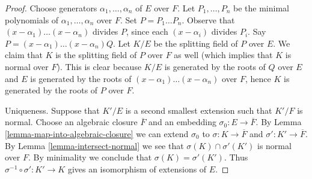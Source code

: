 \documentclass[10pt,a4paper]{amsart}
\theoremstyle{plain}
\theoremstyle{definition}
\theoremstyle{remark}
\numberwithin{equation}{subsection}
\begin{document}
\begin{proof}
Choose generators $\alpha_1, \ldots, \alpha_n$ of $E$ over $F$.
Let $P_1, \ldots, P_n$ be the minimal polynomials of
$\alpha_1, \ldots, \alpha_n$ over $F$. Set $P = P_1 \ldots P_n$.
Observe that $(x - \alpha_1) \ldots (x - \alpha_n)$ divides $P$, since
each $(x - \alpha_i)$ divides $P_i$. Say
$P = (x - \alpha_1) \ldots (x - \alpha_n)Q$.
Let $K/E$ be the splitting field of $P$ over $E$.
We claim that $K$ is the splitting field of $P$ over $F$ as well
(which implies that $K$ is normal over $F$).
This is clear because $K/E$ is generated by the roots of
$Q$ over $E$ and $E$ is generated by the roots of
$(x - \alpha_1) \ldots (x - \alpha_n)$ over $F$, hence
$K$ is generated by the roots of $P$ over $F$.

\medskip\noindent
Uniqueness. Suppose that $K'/E$ is a second smallest extension such that
$K'/F$ is normal. Choose an algebraic closure $\overline{F}$ and an
embedding $\sigma_0 : E \to \overline{F}$. By
Lemma \ref{lemma-map-into-algebraic-closure}
we can extend $\sigma_0$ to $\sigma : K \to \overline{F}$ and
$\sigma' : K' \to \overline{F}$.
By Lemma \ref{lemma-intersect-normal} we see that
$\sigma(K) \cap \sigma'(K')$ is normal over $F$.
By minimality we conclude that $\sigma(K) = \sigma'(K')$.
Thus $\sigma^{-1} \circ \sigma' : K' \to K$ gives an isomorphism
of extensions of $E$.
\end{proof}
\end{document}

